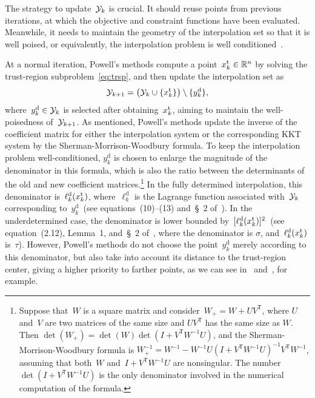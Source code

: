 \documentclass[
    smallextended,  %
    final,          %
]{svjour3}
\newcommand{\R}{\mathbb{R}}
\newcommand{\T}{\mathsf{T}}
\newcommand{\drop}{{\text{d}}}
\newcommand{\iter}[1][k]{x\ifthenelse{\equal{#1}{}}{}{_{#1}}}
\newcommand{\set}[2][]{#1\{#2#1\}}
\newcommand{\trust}{{\text{t}}}
\newcommand{\xpt}[1][k]{\mathcal{Y}\ifthenelse{\equal{#1}{}}{}{_{#1}}}
\newcommand{\kkt}{KKT\xspace}
\begin{document}
The strategy to update~$\xpt$ is crucial.
It should reuse points from previous iterations, at which the objective and constraint functions
have been evaluated.
Meanwhile, it needs to maintain the geometry of the interpolation set so that it is well poised,
or equivalently, the interpolation problem is well conditioned~\cite{Conn_Scheinberg_Vicente_2009b}.

At a normal iteration, Powell's methods compute a point~$\iter^{\trust} \in \R^n$ by solving the
trust-region subproblem~\eqref{eq:trsp}, and then update the interpolation set as
\begin{equation}
    \label{eq:xpt-update-tr}
    \xpt[k + 1] = \big(\xpt \cup \set{\iter^{\trust}}\big) \setminus \set{y_k^{\drop}},
\end{equation}
where~$y_k^{\drop} \in \xpt$ is selected after obtaining~$\iter^{\trust}$, aiming to maintain the
well-poisedness of~$\xpt[k + 1]$.
As mentioned, Powell's methods update the inverse of the coefficient matrix for either the
interpolation system or the corresponding \kkt system by the Sherman-Morrison-Woodbury formula.
To keep the interpolation problem well-conditioned, $y_k^{\drop}$ is chosen
to enlarge the magnitude of the denominator in this formula, which is also the ratio between
the determinants of the old and new coefficient matrices.\footnote{
    Suppose that~$W$ is a square matrix and consider~$W_+ = W + UV^\T$, where $U$ and~$V$ are two
    matrices of the same size and $UV^\T$ has the same size as $W$.
    Then $\det(W_+) = \det(W)\det(I+V^\T W^{-1}U)$, and the
    Sherman-Morrison-Woodbury formula
    is $W_+^{-1} = W^{-1} -W^{-1}U(I+V^\T W^{-1}U)^{-1} V^\T W^{-1}$, assuming that both~$W$
    and~$I+V^\T W^{-1}U$ are nonsingular. The number~$\det(I+V^\T W^{-1}U)$ is the only
    denominator involved in the numerical computation of the formula.
}
In the fully determined interpolation, this denominator is~$\ell_k^\drop(\iter^{\trust})$,
where~$\ell_k^\drop$ is the Lagrange function associated with~$\xpt$ corresponding
to~$y_k^\drop$~(see equations~\mbox{(10)--(13)} and~\S~2 of~\cite{Powell_2001}).
In the underdetermined case, the denominator is lower
bounded by~$[\ell_k^{\drop}(\iter^{\trust})]^2$~(see equation~(2.12), Lemma~1, and~\S~2 of~\cite{Powell_2004c},
where the denominator is $\sigma$, and~$\ell_k^{\drop}(\iter^{\trust})$ is~$\tau$).
However, Powell's methods do not choose the point~$y_k^\drop$ merely according to this denominator, but also
take into account its distance to the trust-region center, giving a higher priority to farther
points, as we can see in~\cite[equation~(56)]{Powell_2002} and~\cite[equations~(7.4)--(7.5)]{Powell_2006}, for example.
\end{document}
